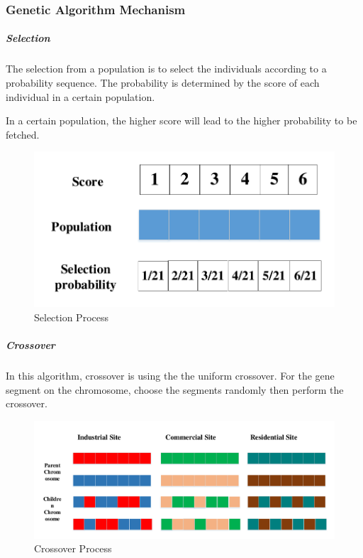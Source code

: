 \documentclass[11pt, a4paper]{article}
\begin{document}
\subsubsection{Genetic Algorithm Mechanism}


\subparagraph{Selection}

The selection from a population is to select the individuals according to a probability sequence. The probability is determined by the score of each individual in a certain population. 

In a certain population, the higher score will lead to the higher probability to be fetched. 

\begin{figure}[htbp]
	\centering 
	\includegraphics[scale=0.4]{selection}
	\caption{Selection Process} %
\end{figure}

\subparagraph{Crossover}

In this algorithm, crossover is using the the uniform crossover. For the gene segment on the chromosome, choose the segments randomly then perform the crossover.

\begin{figure}[htbp]
	\centering 
	\includegraphics[scale=0.4]{crossover}
	\caption{Crossover Process} %
\end{figure}
\end{document}

